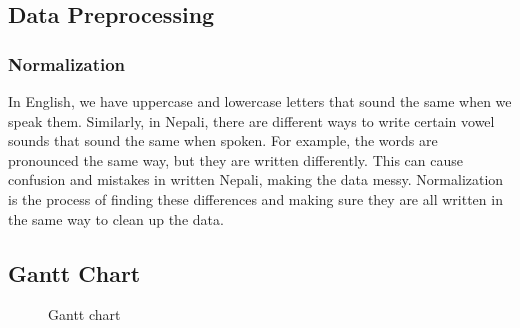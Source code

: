        \subsection{Data Preprocessing}
       \subsubsection{Normalization}
       In English, we have uppercase and lowercase letters that sound the same when we speak them. Similarly, in Nepali, there are different ways to write certain vowel sounds that sound the same when spoken. For example, the words 
        are pronounced the same way, but they are written differently. This can cause confusion and mistakes in written Nepali, making the data messy. Normalization is the process of finding these differences and making sure they are all written in the same way to clean up the data.


       
        \newpage
        \subsection{Gantt Chart}
            \begin{figure}[hbt!]
                \caption{Gantt chart}
            \end{figure}

